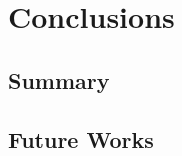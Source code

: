\section{Conclusions}
\label{ch:final}

\subsection{Summary}

\subsection{Future Works}

\cleardoublepage